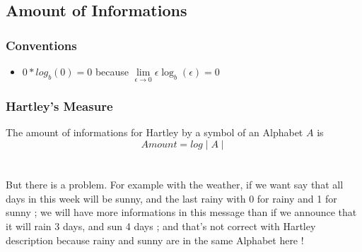 \documentclass{article}
\begin{document}
\subsection{Amount of Informations} 

\subsubsection{Conventions}
\begin{itemize}
\item $ 0*log_b(0) = 0 $ because $ \lim\limits_{\epsilon \to 0}\epsilon \log_{b}(\epsilon) = 0 $
\end{itemize}

\subsubsection{Hartley's Measure} The amount of informations for Hartley by a symbol of an Alphabet $ A $ is
\begin{equation}
Amount = log \mid A \mid
\end{equation}
\\
\\
But there is a problem. For example with the weather, if we want say that all days in this week will be sunny, and the last rainy with 0 for rainy and 1 for sunny ; we will have more informations in this message than if we announce that it will rain 3 days, and sun 4 days ; and that's not correct with Hartley description because rainy and sunny are in the same Alphabet here !
\end{document}
